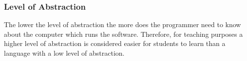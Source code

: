 \subsubsection{Level of Abstraction}

The lower the level of abstraction the more does the programmer need to know about the computer which runs the software. Therefore, for teaching 
purposes a higher level of abstraction is considered easier for students to learn than a language with a low level of abstraction.